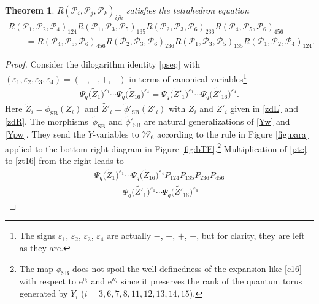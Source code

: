 \documentclass[pdftex]{sigma}
\newcommand{\e}{{\mathrm e}}
\newcommand{\uu}{{\mathsf u}}
\newcommand{\ww}{{\mathsf w}}
\numberwithin{equation}{section}
\newtheorem{Theorem}{Theorem}[section]
\begin{document}
\begin{Theorem}\label{th:main}
$R(\mathscr{P}_i, \mathscr{P}_j, \mathscr{P}_k)_{ijk} $ satisfies the tetrahedron equation
\begin{gather}
 R(\mathscr{P}_1, \mathscr{P}_2, \mathscr{P}_4)_{124}
R(\mathscr{P}_1, \mathscr{P}_3, \mathscr{P}_5)_{135}
R(\mathscr{P}_2, \mathscr{P}_3, \mathscr{P}_6)_{236}
R(\mathscr{P}_4, \mathscr{P}_5, \mathscr{P}_6)_{456}\nonumber
\\
\qquad= R(\mathscr{P}_4, \mathscr{P}_5, \mathscr{P}_6)_{456}
R(\mathscr{P}_2, \mathscr{P}_3, \mathscr{P}_6)_{236}
R(\mathscr{P}_1, \mathscr{P}_3, \mathscr{P}_5)_{135}
R(\mathscr{P}_1, \mathscr{P}_2, \mathscr{P}_4)_{124}.\label{tela}
\end{gather}
\end{Theorem}
\begin{proof}
 Consider the dilogarithm identity \eqref{pseq} with
 $(\varepsilon_1,\varepsilon_2,\varepsilon_3,\varepsilon_4) =(-, -,
 +, +)$ in terms of canonical variables\footnote{The signs
 $\varepsilon_1$, $\varepsilon_2$, $\varepsilon_3$, $\varepsilon_4$
 are actually $-$, $-$, $+$, $+$, but for clarity, they are left as
 they are.}
\begin{align}\label{zt16}
\Psi_q\bigl(\tilde{Z}_1\bigr)^{\varepsilon_1}\dotsm \Psi_q\bigl({\tilde Z}_{16}\bigr)^{\varepsilon_4}
=
\Psi_q\bigl(\tilde{Z'}_1\bigr)^{\varepsilon_1}\dotsm \Psi_q\bigl(\tilde{Z'}_{16}\bigr)^{\varepsilon_4}.
\end{align}
Here $\tilde{Z}_i = \tilde{\phi}_\mathrm{SB}(Z_i)$ and
$\tilde{Z'}_i =\tilde{\phi}'_\mathrm{SB}(Z'_i)$ with $Z_i$ and $Z'_i$
given in \eqref{zdL} and \eqref{zdR}. The morphisms~$\tilde{\phi}_\mathrm{SB}$ and $\tilde{\phi}'_\mathrm{SB}$ are natural
generalizations of \eqref{Yw} and \eqref{Ypw}. They send the
$Y$-variables to $\mathcal{W}_6$ according to the rule in Figure
\ref{fig:para} applied to the bottom right diagram in Figure
\ref{fig:bTE}.\footnote{The map $\phi_\mathrm{SB}$ does not spoil the
 well-definedness of the expansion like \eqref{c16} with respect to
 $\e^{\uu_i}$ and $\e^{\ww_i}$ since it preserves the rank of the quantum
 torus generated by $Y_i$ ($i=3, 6 , 7 , 8 , 11 , 12 , 13 ,
 14 , 15$).}
%
Multiplication of \eqref{pte} to \eqref{zt16} from the right leads to
\begin{gather}
\Psi_q\bigl(\tilde{Z}_1\bigr)^{\varepsilon_1}\dotsm \Psi_q\bigl({\tilde Z}_{16}\bigr)^{\varepsilon_4}
P_{124}P_{135}P_{236}P_{456}\nonumber\\
\qquad=
\Psi_q\bigl(\tilde{Z'}_1\bigr)^{\varepsilon_1}\dotsm \Psi_q\bigl(\tilde{Z'}_{16}\bigr)^{\varepsilon_4}

\end{gather}
\end{proof}
\end{document}
